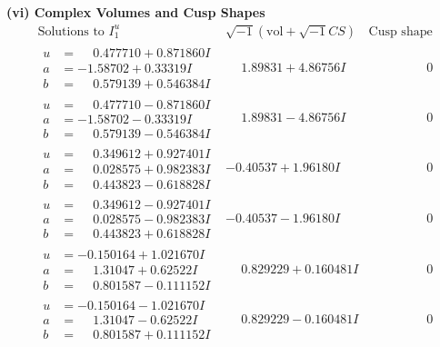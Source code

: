\documentclass[1p]{elsarticle_modified}
\theoremstyle{definition}
\newcommand{\I}{\sqrt{-1}}
\begin{document}
\newpage\flushleft \textbf{(vi) Complex Volumes and Cusp Shapes}
$$\begin{array}{c|c|c}  
\text{Solutions to }I^u_{1}& \I (\text{vol} + \sqrt{-1}CS) & \text{Cusp shape}\\
 \hline 
\begin{aligned}
u &= \phantom{-}0.477710 + 0.871860 I \\
a &= -1.58702 + 0.33319 I \\
b &= \phantom{-}0.579139 + 0.546384 I\end{aligned}
 & \phantom{-}1.89831 + 4.86756 I & \phantom{-0.000000 } 0 \\ \hline\begin{aligned}
u &= \phantom{-}0.477710 - 0.871860 I \\
a &= -1.58702 - 0.33319 I \\
b &= \phantom{-}0.579139 - 0.546384 I\end{aligned}
 & \phantom{-}1.89831 - 4.86756 I & \phantom{-0.000000 } 0 \\ \hline\begin{aligned}
u &= \phantom{-}0.349612 + 0.927401 I \\
a &= \phantom{-}0.028575 + 0.982383 I \\
b &= \phantom{-}0.443823 - 0.618828 I\end{aligned}
 & -0.40537 + 1.96180 I & \phantom{-0.000000 } 0 \\ \hline\begin{aligned}
u &= \phantom{-}0.349612 - 0.927401 I \\
a &= \phantom{-}0.028575 - 0.982383 I \\
b &= \phantom{-}0.443823 + 0.618828 I\end{aligned}
 & -0.40537 - 1.96180 I & \phantom{-0.000000 } 0 \\ \hline\begin{aligned}
u &= -0.150164 + 1.021670 I \\
a &= \phantom{-}1.31047 + 0.62522 I \\
b &= \phantom{-}0.801587 - 0.111152 I\end{aligned}
 & \phantom{-}0.829229 + 0.160481 I & \phantom{-0.000000 } 0 \\ \hline\begin{aligned}
u &= -0.150164 - 1.021670 I \\
a &= \phantom{-}1.31047 - 0.62522 I \\
b &= \phantom{-}0.801587 + 0.111152 I\end{aligned}
 & \phantom{-}0.829229 - 0.160481 I & \phantom{-0.000000 } 0 \\ \hline\begin{aligned}

\end{aligned}
\end{array}$$
\end{document}
